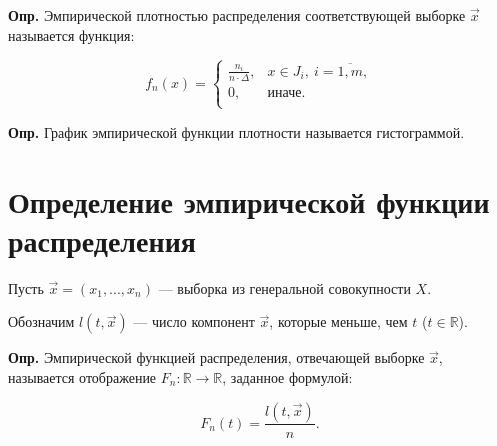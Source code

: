 \textbf{Опр.} Эмпирической плотностью распределения соответствующей
выборке $\vec{x}$ называется функция:

\begin{equation}
	f_n(x) =
	\begin{cases}
		\frac{n_i}{n \cdot \Delta}, &x \in J_i,~i = \overline{1, m}, \\
		0, &\text{иначе}. \\
	\end{cases}
\end{equation}

\textbf{Опр.} График эмпирической функции плотности называется гистограммой.

\section{Определение эмпирической функции распределения}

Пусть $\vec{x} = (x_1, ..., x_n)$ --- выборка из генеральной совокупности $X$.

Обозначим $l(t, \vec{x})$ --- число компонент $\vec{x}$, которые меньше, чем $t$ ($t \in \mathbb{R}$).

\textbf{Опр.} Эмпирической функцией распределения, отвечающей выборке $\vec{x}$, называется отображение $F_n: \mathbb{R} \to \mathbb{R}$, заданное формулой: 

\begin{equation}
	F_n(t) = \frac{l(t, \vec x)}{n}.
\end{equation}